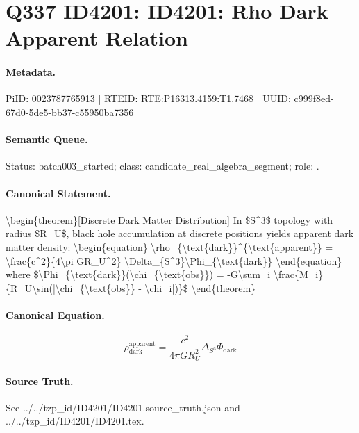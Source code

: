 \section*{Q337 ID4201: ID4201: Rho Dark Apparent Relation}
\paragraph{Metadata.}
PiID: 0023787765913 | RTEID: RTE:P16313.4159:T1.7468 | UUID: c999f8ed-67d0-5de5-bb37-c55950ba7356

\paragraph{Semantic Queue.}
Status: batch003\_started; class: candidate\_real\_algebra\_segment; role: .

\paragraph{Canonical Statement.}
\textbackslash{}begin\{theorem\}[Discrete Dark Matter Distribution] In \$S\textasciicircum{}3\$ topology with radius \$R\_U\$, black hole accumulation at discrete positions yields apparent dark matter density: \textbackslash{}begin\{equation\} \textbackslash{}rho\_\{\textbackslash{}text\{dark\}\}\textasciicircum{}\{\textbackslash{}text\{apparent\}\} = \textbackslash{}frac\{c\textasciicircum{}2\}\{4\textbackslash{}pi GR\_U\textasciicircum{}2\} \textbackslash{}Delta\_\{S\textasciicircum{}3\}\textbackslash{}Phi\_\{\textbackslash{}text\{dark\}\} \textbackslash{}end\{equation\} where \$\textbackslash{}Phi\_\{\textbackslash{}text\{dark\}\}(\textbackslash{}chi\_\{\textbackslash{}text\{obs\}\}) = -G\textbackslash{}sum\_i \textbackslash{}frac\{M\_i\}\{R\_U\textbackslash{}sin(|\textbackslash{}chi\_\{\textbackslash{}text\{obs\}\} - \textbackslash{}chi\_i|)\}\$ \textbackslash{}end\{theorem\}

\paragraph{Canonical Equation.}
\[
\begin{equation} \rho_{\text{dark}}^{\text{apparent}} = \frac{c^2}{4\pi GR_U^2} \Delta_{S^3}\Phi_{\text{dark}} \end{equation}
\]

\paragraph{Source Truth.}
See ../../tzp\_id/ID4201/ID4201.source\_truth.json and ../../tzp\_id/ID4201/ID4201.tex.
